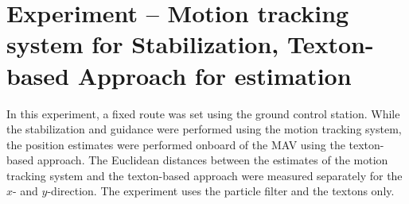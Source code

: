 \section{Experiment -- Motion tracking system for Stabilization, Texton-based Approach for estimation}
\label{sec:experiment-real}

In this experiment, a fixed route was set using the ground control
station. While the stabilization and guidance were performed using
the motion tracking system, the position estimates were performed onboard
of the MAV using the texton-based approach. The Euclidean distances between the estimates of the motion tracking system and the texton-based approach
were measured separately for the $x$- and $y$-direction. The experiment uses the
particle filter and the textons only.